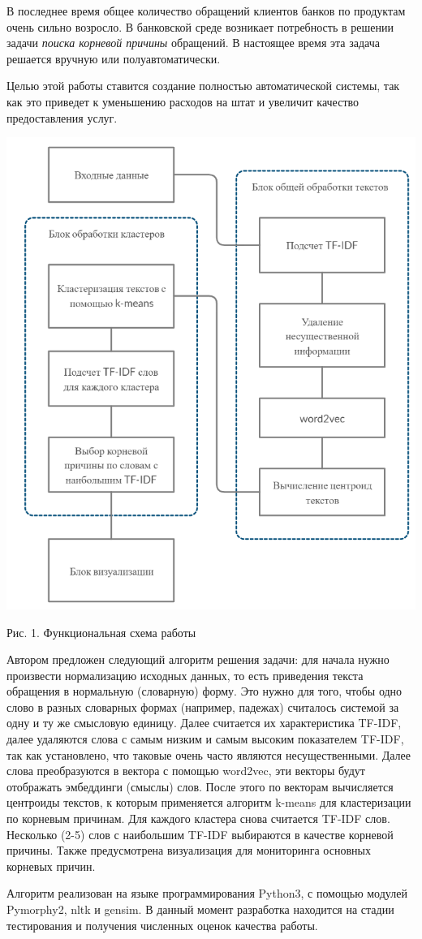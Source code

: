 \documentclass[a4paper,12pt,preview]{report} %
\begin{document}
	В последнее время общее количество обращений клиентов банков по продуктам очень сильно возросло. В банковской среде возникает потребность в решении задачи \textit{поиска корневой причины} обращений. В настоящее время эта задача решается вручную или полуавтоматически.
	
	Целью этой работы ставится создание полностью автоматической системы, так как это приведет к уменьшению расходов на штат и увеличит качество предоставления услуг.
	
	\begin{center}
	\includegraphics[scale=0.5]{SCHEME.png}
	
	Рис. 1. Функциональная схема работы
	\end{center}
	
	Автором предложен следующий алгоритм решения задачи: для начала нужно произвести нормализацию исходных данных, то есть приведения текста обращения в нормальную (словарную) форму. Это нужно для того, чтобы одно слово в разных словарных формах (например, падежах) считалось системой за одну и ту же смысловую единицу. Далее считается их характеристика TF-IDF, далее удаляются слова с самым низким и самым высоким показателем TF-IDF, так как установлено, что таковые очень часто являются несущественными. Далее слова преобразуются в вектора с помощью word2vec, эти векторы будут отображать эмбеддинги (смыслы) слов. После этого по векторам вычисляется центроиды текстов, к которым применяется алгоритм k-means для кластеризации по корневым причинам. Для каждого кластера снова считается TF-IDF слов. Несколько (2-5) слов с наибольшим TF-IDF выбираются в качестве корневой причины. Также предусмотрена визуализация для мониторинга основных корневых причин.	
	
	Алгоритм реализован на языке программирования Python3, с помощью модулей Pymorphy2, nltk и gensim. В данный момент разработка находится на стадии тестирования и получения численных оценок качества работы.
	
	
	
\end{document}
